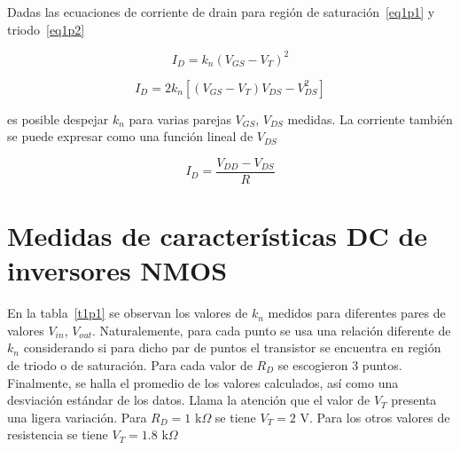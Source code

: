 \documentclass[twocolumn]{IEEEtran}
\begin{document}
Dadas las ecuaciones de corriente de drain para región de saturación~\ref{eq1p1} y triodo~\ref{eq1p2}

\begin{equation}
I_D = k_n(V_{GS}-V_T)^2
\label{eq1p1}
\end{equation}

\begin{equation}
I_D = 2k_n[(V_{GS}-V_T)V_{DS}-V_{DS}^2]
\label{eq1p2}
\end{equation}

es posible despejar $k_n$ para varias parejas $V_{GS}$, $V_{DS}$ medidas. La corriente también se puede expresar como una función lineal de $V_{DS}$ 

\begin{equation}
I_D = \dfrac{V_{DD}-V_{DS}}{R}
\end{equation}

\section{Medidas de características DC de inversores NMOS}
En la tabla~\ref{t1p1} se observan los valores de $k_n$ medidos para diferentes pares de valores $V_{in}$, $V_{out}$. Naturalemente, para cada punto se usa una relación diferente de $k_n$ considerando si para dicho par de puntos el transistor se encuentra en región de triodo o de saturación. Para cada valor de  $R_D$ se escogieron 3 puntos. Finalmente, se halla el promedio de los valores calculados, así como una desviación estándar de los datos. Llama la atención que el valor de $V_T$ presenta una ligera variación. Para $R_D=1$ k$\Omega$ se tiene $V_T=2$ V. Para los otros valores de resistencia se tiene  $V_T=1.8$ k$\Omega$
\end{document}
